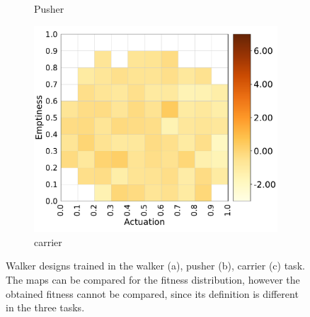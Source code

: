 \begin{figure}
\begin{subfigure}[b]{0.3\textwidth}
         \caption{Pusher}
         \label{walker_b}
     \end{subfigure}
     \hfill
     \begin{subfigure}[b]{0.3\textwidth}
         \centering
         \includegraphics[scale=0.3]{images/multitasking/walker_c.pdf}
         \caption{carrier}
         \label{walker_c}
     \end{subfigure}
    \caption{Walker designs trained in the walker (a), pusher (b), carrier (c) task.
    The maps can be compared for the fitness distribution, however the obtained fitness cannot be compared, since its definition is different in the three tasks.}
    \label{fig:walker_multitask}
\end{figure}

